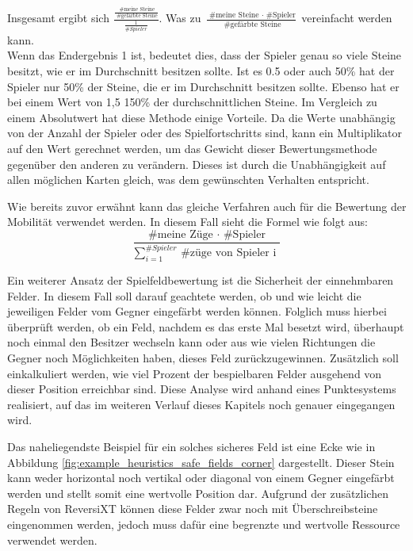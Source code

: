 \documentclass[12pt,a4paper,bibliography=totocnumbered,listof=totocnumbered]{article}
\begin{document}
Insgesamt ergibt sich
\( \frac{ \frac{\text{ \# meine Steine}}{\text{ \# gefärbte Steine}} }{ \frac{1}{ \# Spieler} } \).
Was zu
\( \frac{ \text{ \# meine Steine } \cdot \text{ \# Spieler} }{ \text{ \# gefärbte Steine} } \) 
vereinfacht werden kann.\\
Wenn das Endergebnis 1 ist, bedeutet dies, dass der Spieler genau so viele Steine besitzt, wie er im Durchschnitt besitzen sollte. Ist es 0.5 oder auch 50\% hat der Spieler nur 50\% der Steine, die er im Durchschnitt besitzen sollte. Ebenso hat er bei einem Wert von 1,5 150\% der durchschnittlichen Steine.
Im Vergleich zu einem Absolutwert hat diese Methode einige Vorteile. Da die Werte unabhängig von der Anzahl der Spieler oder des Spielfortschritts sind, kann ein Multiplikator auf den Wert gerechnet werden, um das Gewicht dieser Bewertungsmethode gegenüber den anderen zu verändern. Dieses ist durch die Unabhängigkeit auf allen möglichen Karten gleich, was dem gewünschten Verhalten entspricht.

Wie bereits zuvor erwähnt kann das gleiche Verfahren auch für die Bewertung der Mobilität verwendet werden. In diesem Fall sieht die Formel wie folgt aus:
\[ \frac{ \text{ \# meine Züge } \cdot \text{ \# Spieler } }{ \sum_{i=1}^{ \#Spieler} \text{ \# züge von Spieler i } }  \]


Ein weiterer Ansatz der Spielfeldbewertung ist die \glqq Sicherheit\grqq{} der einnehmbaren Felder. In diesem Fall soll darauf geachtete werden, ob und wie leicht die jeweiligen Felder vom Gegner eingefärbt werden können. Folglich muss hierbei überprüft werden, ob ein Feld, nachdem es das erste Mal besetzt wird, überhaupt noch einmal den Besitzer wechseln kann oder aus wie vielen Richtungen die Gegner noch Möglichkeiten haben, dieses Feld zurückzugewinnen. Zusätzlich soll einkalkuliert werden, wie viel Prozent der bespielbaren Felder ausgehend von dieser Position erreichbar sind. Diese Analyse wird anhand eines Punktesystems realisiert, auf das im weiteren Verlauf dieses Kapitels noch genauer eingegangen wird.

Das naheliegendste Beispiel für ein solches sicheres Feld ist eine Ecke wie in Abbildung \ref{fig:example_heuristics_safe_fields_corner} dargestellt. Dieser Stein kann weder horizontal noch vertikal oder diagonal von einem Gegner eingefärbt werden und stellt somit eine wertvolle Position dar. Aufgrund der zusätzlichen Regeln von ReversiXT können diese Felder zwar noch mit Überschreibsteine eingenommen werden, jedoch muss dafür eine begrenzte und wertvolle Ressource verwendet werden.
\end{document}
